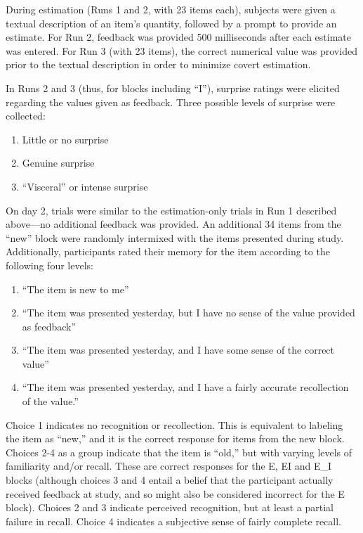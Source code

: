 During estimation (Runs 1 and 2, with 23 items each), subjects were given a
textual description of an item's quantity, followed by a prompt to provide an
estimate. For Run 2, feedback was provided 500 milliseconds after each estimate
was entered. For Run 3 (with 23 items), the correct numerical value was provided
prior to the textual description in order to minimize covert estimation.

In Runs 2 and 3 (thus, for blocks including ``I''), surprise ratings were elicited
regarding the values given as feedback. Three possible levels of surprise were
collected: 

\begin{enumerate}
\item Little or no surprise
\item Genuine surprise
\item ``Visceral'' or intense surprise
\end{enumerate}

On day 2, trials were similar to the estimation-only trials in Run 1 described
above---no additional feedback was provided. An additional 34 items from the
``new'' block were randomly intermixed with the items presented during study.
Additionally, participants rated their memory for the item according to the
following four levels: 

\begin{enumerate}
\item ``The item is new to me'' 
\item ``The item was presented yesterday, but I have no sense of the value 
provided as feedback'' 
\item ``The item was presented yesterday, and I have some sense of the correct value''
\item ``The item was presented yesterday, and I have a fairly accurate recollection of
the value.'' 
\end{enumerate}

Choice 1 indicates no recognition or recollection.  This is equivalent to
labeling the item as ``new,'' and it is the correct response for items from the
new block.  Choices 2-4 as a group indicate that the item is ``old,'' but with
varying levels of familiarity and/or recall.  These are correct responses for
the E, EI and E\_I blocks (although choices 3 and 4 entail a belief that the
participant actually received feedback at study, and so might also be considered
incorrect for the E block). Choices 2 and 3 indicate perceived recognition, but
at least a partial failure in recall.  Choice 4 indicates a subjective sense of
fairly complete recall.

